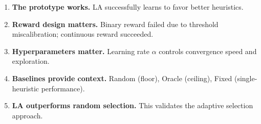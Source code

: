 \documentclass[11pt]{article}
\begin{document}
\begin{enumerate}[itemsep=0.5em]
  \item \textbf{The prototype works.} LA successfully learns to favor better heuristics.
  \item \textbf{Reward design matters.} Binary reward failed due to threshold miscalibration; continuous reward succeeded.
  \item \textbf{Hyperparameters matter.} Learning rate $\alpha$ controls convergence speed and exploration.
  \item \textbf{Baselines provide context.} Random (floor), Oracle (ceiling), Fixed (single-heuristic performance).
  \item \textbf{LA outperforms random selection.} This validates the adaptive selection approach.
\end{enumerate}
\end{document}
